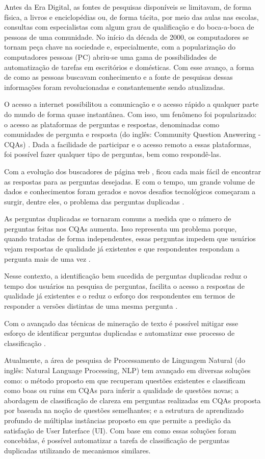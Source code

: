 \documentclass[conference]{IEEEtran}
\begin{document}
Antes da Era Digital, as fontes de pesquisas disponíveis se limitavam, de forma física, a livros e enciclopédias ou, de forma tácita, por meio das aulas nas escolas, consultas com especialistas com algum grau de qualificação e do boca-a-boca de pessoas de uma comunidade. No início da década de 2000, os computadores se tornam peça chave na sociedade e, especialmente, com a popularização do computadores pessoas (PC) abriu-se uma gama de possibilidades de automatização de tarefas em escritórios e domésticas. Com esse avanço, a forma de como as pessoas buscavam conhecimento e a fonte de pesquisas dessas informações foram revolucionadas e constantemente sendo atualizadas.

O acesso a internet possibilitou a comunicação e o acesso rápido a qualquer parte do mundo de forma quase instantânea. Com isso, um fenômeno foi popularizado: o acesso as plataformas de perguntas e respostas, denominadas como comunidades de pergunta e resposta (do inglês: Community Question Answering - CQAs) \cite{Shah2009}. Dada a facilidade de participar e o acesso remoto a essas plataformas, foi possível fazer qualquer tipo de perguntas, bem como respondê-las.

Com a evolução dos buscadores de página web \cite{Ntoulas2004}, ficou cada mais fácil de encontrar as respostas para as perguntas desejadas. E com o tempo, um grande volume de dados e conhecimentos foram gerados e novos desafios tecnológicos começaram a surgir, dentre eles, o problema das perguntas duplicadas \cite{ravi2014}. 

As perguntas duplicadas se tornaram comuns a medida que o número de perguntas feitas nos CQAs aumenta. Isso representa um problema porque, quando tratadas de forma independentes, essas perguntas impedem que usuários vejam respostas de qualidade já existentes e que respondentes respondam a pergunta mais de uma vez \cite{sharma2019}.

Nesse contexto, a identificação bem sucedida de perguntas duplicadas reduz o tempo dos usuários na pesquisa de perguntas, facilita o acesso a respostas de qualidade já existentes e o reduz o esforço dos respondentes em termos de responder a versões distintas de uma mesma pergunta \cite{ravi2014, sharma2019}.

Com o avançado das técnicas de mineração de texto é possível mitigar esse esforço de identificar perguntas duplicadas e automatizar esse processo de classificação \cite{Zhang2015}.

Atualmente, a área de pesquisa de Processamento de Linguagem Natural (do inglês: Natural Language Processing, NLP) tem avançado em diversas soluções como: o método proposto em \cite{arora2015} que recuperam questões existentes e classificam como boas ou ruins em CQAs para inferir a qualidade de questões novas; a abordagem de classificação de clareza em perguntas realizadas em CQAs proposta por \cite{Trienes2019} baseada na noção de questões semelhantes; e a estrutura de aprendizado profundo de múltiplas instâncias proposto em \cite{Chen2017} que permite a predição da satisfação de User Interface (UI). Com base em como essas soluções foram concebidas, é possível automatizar a tarefa de classificação de perguntas duplicadas utilizando de mecanismos similares.
\end{document}
